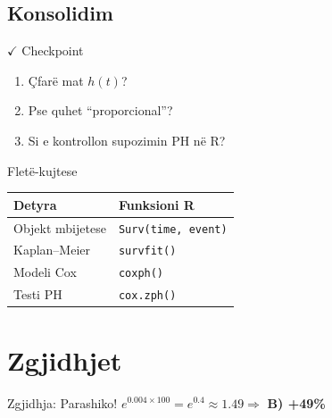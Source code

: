 \documentclass[aspectratio=169,10pt,xcolor={dvipsnames,table}]{beamer}
\newcommand{\Rkey}[1]{\texttt{\textcolor{uptmid}{#1}}}
\newcommand{\kthehu}[1]{\hyperlink{#1}{\beamerreturnbutton{Kthehu}}}
\begin{document}
\subsection{Konsolidim}
\begin{frame}{\textcolor{accent}{$\checkmark$} Checkpoint}
  \begin{enumerate}
    \item Çfarë mat $h(t)$?
    \item Pse quhet ``proporcional''?
    \item Si e kontrollon supozimin PH në R?
  \end{enumerate}
\end{frame}

\begin{frame}{Fletë-kujtese}
  \begin{tabular}{@{}ll@{}}
    \toprule
    Detyra & Funksioni R \\ \midrule
    Objekt mbijetese & \Rkey{Surv(time, event)} \\
    Kaplan--Meier & \Rkey{survfit()} \\
    Modeli Cox & \Rkey{coxph()} \\
    Testi PH & \Rkey{cox.zph()} \\ \bottomrule
  \end{tabular}
\end{frame}

\appendix
\section*{Zgjidhjet}
\begin{frame}[label=zgjidhja1]{Zgjidhja: Parashiko!}
  $e^{0.004\times100}=e^{0.4}\approx1.49 \Rightarrow$ \textbf{B) +49\%}
  \vfill\kthehu{pyetja1}
\end{frame}
\end{document}
